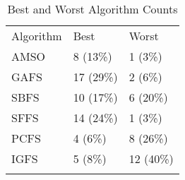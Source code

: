 \begin{table}
\caption{Best and Worst Algorithm Counts}
\label{tbl:best:worst:count}
\begin{tabular}{lll}
\noalign{\smallskip}\hline\noalign{\smallskip}
Algorithm&Best&Worst\\
\noalign{\smallskip}\hline
AMSO&8 (13\%)&1 (3\%)\\
GAFS&17 (29\%)&2 (6\%)\\
SBFS&10 (17\%)&6 (20\%)\\
SFFS&14 (24\%)&1 (3\%)\\
PCFS&4 (6\%)&8 (26\%)\\
IGFS&5 (8\%)&12 (40\%)\\
\noalign{\smallskip}\hline
\end{tabular}
\end{table}
